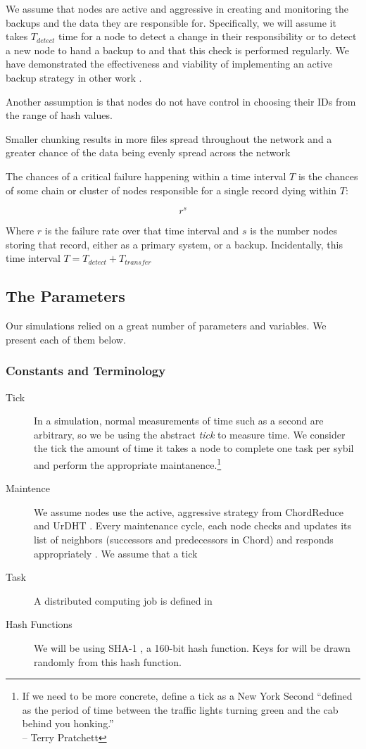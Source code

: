 We assume that nodes are active and aggressive in creating and monitoring the backups and the data they are responsible for.
Specifically, we will assume it takes  $T_{detect}$ time for a node to detect a change in their responsibility or to detect a new node to hand a backup to and that this check is performed regularly. 
We have demonstrated the effectiveness and viability of implementing an active backup strategy in other work \cite{chordreduce} \cite{urdht}.


Another assumption is that nodes do not have control in choosing their IDs from the range of hash values.

Smaller chunking results in more files spread throughout the  network and a greater chance of the data being evenly spread across the network 

The chances of a critical failure happening within a time interval $ T $ is the chances of some chain or cluster of nodes responsible for a single record dying within $ T $:

$$r^{s}$$

Where $ r $ is the failure rate over that time interval and $s$ is the number nodes storing that record, either as a primary system, or a backup.
Incidentally, this time interval $T = T_{detect} + T_{transfer} $



\subsection{The Parameters}

Our simulations relied on a great number of parameters and variables.
We present each of them below.

\subsubsection{Constants and Terminology}

\begin{description}
	\item [Tick] In a simulation, normal measurements of time such as a second are arbitrary, so we be using the abstract \textit{tick} to measure time.  
	We consider the tick the amount of time it takes a node to complete one task per sybil and perform the appropriate maintanence.\footnote{If we need to be more concrete, define a tick as a New York Second ``defined as the period of time between the traffic lights turning green and the cab behind you honking.''\\-- Terry Pratchett}
	\item [Maintence] We assume nodes use the active, aggressive strategy from ChordReduce and  UrDHT \cite{chordreduce} \cite{urdht}.
	Every maintenance cycle, each node checks and updates its list of neighbors (successors and predecessors in Chord) and responds appropriately . 
	We assume that a tick
	\item [Task] A distributed computing job is defined in 
	\item [Hash Functions] We will be using SHA-1 \cite{sha1}, a 160-bit hash function.  
	Keys for  will be drawn randomly from this hash function.
\end{description}

